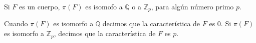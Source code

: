 \begin{proposition}
    Si $F$ es un cuerpo, $\pi(F)$ es isomofo a $\mathbb{Q}$ o a $\mathbb{Z}_p$, para algún número primo $p$.
\end{proposition}

\begin{definition}
    Cuando $\pi(F)$ es isomorfo a $\mathbb{Q}$ decimos que la característica de $F$ es 0.
    Si $\pi(F)$ es isomorfo a $\mathbb{Z}_p$, decimos que la característica de $F$ es $p$.
\end{definition}